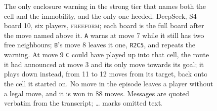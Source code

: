 \begin{figure}[tbp]
    \centering
    \caption{The only enclosure warning in the strong tier that names both the
    cell and the immobility, and the only one heeded. DeepSeek, S4 board 10,
    six players, \textsc{freeform}; each board is the full board after the
    move named above it. \texttt{A} warns at move 7 while it still has two free
    neighbours; \texttt{B}'s move 8 leaves it one, \texttt{R2C5}, and
    repeats the warning. At move 9 \texttt{C} could have played up into
    that cell, the route it had announced at move 3 and its only move towards
    its goal; it plays down instead, from 11 to 12 moves from its target,
    back onto the cell it started on.
    No move in the episode leaves a player without a legal move, and it is
    won in 88 moves. Messages are quoted verbatim from the transcript;
    \ldots{} marks omitted text.}
    \label{fig:warning-heeded}
\end{figure}
